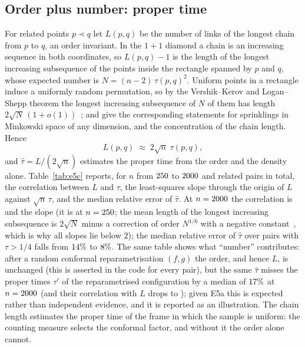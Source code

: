 \documentclass[11pt,a4paper]{article}
\theoremstyle{plain}
\theoremstyle{definition}
\theoremstyle{remark}
\begin{document}
\subsection*{Order plus number: proper time}
For related points $p\prec q$ let $L(p,q)$ be the number of links of the longest chain from $p$ to $q$, an order invariant. In the $1{+}1$ diamond a chain is an increasing sequence in both coordinates, so $L(p,q)-1$ is the length of the longest increasing subsequence of the points inside the rectangle spanned by $p$ and $q$, whose expected number is $N=(n-2)\,\tau(p,q)^2$. Uniform points in a rectangle induce a uniformly random permutation, so by the Vershik--Kerov and Logan--Shepp theorem the longest increasing subsequence of $N$ of them has length $2\sqrt N\,(1+o(1))$~\citep{vershik1977,loganshepp1977}; \citet{brightwell1991} and \citet{bollobas1991} give the corresponding statements for sprinklings in Minkowski space of any dimension, and \citet{bollobas1992} the concentration of the chain length. Hence
\[
L(p,q)\;\approx\;2\sqrt n\;\tau(p,q),
\]
and $\hat\tau=L/(2\sqrt n)$ estimates the proper time from the order and the density alone. Table~\ref{tab:e5c} reports, for $n$ from $250$ to $2000$ and \EfiveCpairsTotal{} related pairs in total, the correlation between $L$ and $\tau$, the least-squares slope through the origin of $L$ against $\sqrt n\,\tau$, and the median relative error of $\hat\tau$. At $n=2000$ the correlation is \EfiveCcorrLast{} and the slope \EfiveCslopeLast{} (it is \EfiveCslopeFirst{} at $n=250$; the mean length of the longest increasing subsequence is $2\sqrt N$ minus a correction of order $N^{1/6}$ with a negative constant~\citep{baik1999}, which is why all slopes lie below $2$); the median relative error of $\hat\tau$ over pairs with $\tau>1/4$ falls from $14\%$ to $8\%$. The same table shows what ``number'' contributes: after a random conformal reparametrisation $(f,g)$ the order, and hence $L$, is unchanged (this is asserted in the code for every pair), but the same $\hat\tau$ misses the proper times $\tau'$ of the reparametrised configuration by a median of $17\%$ at $n=2000$ (and their correlation with $L$ drops to \EfiveCcorrDistLast); given E5a this is expected rather than independent evidence, and it is reported as an illustration. The chain length estimates the proper time of the frame in which the sample is uniform: the counting measure selects the conformal factor, and without it the order alone cannot.
\end{document}
